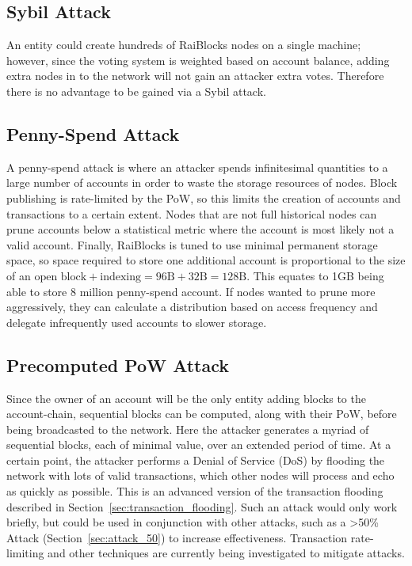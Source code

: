 \subsection{Sybil Attack}
An entity could create hundreds of RaiBlocks nodes on a single machine; however, since the voting system is weighted based on account balance, adding extra nodes in to the network will not gain an attacker extra votes. Therefore there is no advantage to be gained via a Sybil attack.

\subsection{Penny-Spend Attack}
A penny-spend attack is where an attacker spends infinitesimal quantities to a large number of accounts in order to waste the storage resources of nodes. Block publishing is rate-limited by the PoW, so this limits the creation of accounts and transactions to a certain extent. Nodes that are not full historical nodes can prune accounts below a statistical metric where the account is most likely not a valid account. Finally, RaiBlocks is tuned to use minimal permanent storage space, so space required to store one additional account is proportional to the size of an $\text{open block} + \text{indexing} = 96\text{B} + 32\text{B} = 128\text{B}$. This equates to 1GB being able to store 8 million penny-spend account. If nodes wanted to prune more aggressively, they can calculate a distribution based on access frequency and delegate infrequently used accounts to slower storage.

\subsection{Precomputed PoW Attack}
Since the owner of an account will be the only entity adding blocks to the account-chain, sequential blocks can be computed, along with their PoW, before being broadcasted to the network. Here the attacker generates a myriad of sequential blocks, each of minimal value, over an extended period of time. At a certain point, the attacker performs a Denial of Service (DoS) by flooding the network with lots of valid transactions, which other nodes will process and echo as quickly as possible. This is an advanced version of the transaction flooding described in Section~\ref{sec:transaction_flooding}. Such an attack would only work briefly, but could be used in conjunction with other attacks, such as a \textgreater 50\% Attack (Section~\ref{sec:attack_50}) to increase effectiveness. Transaction rate-limiting and other techniques are currently being investigated to mitigate attacks.

